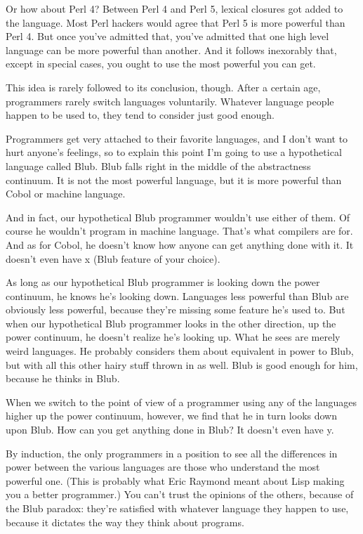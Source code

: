 \documentclass[10pt,twoside,openright]{memoir}
\begin{document}
Or how about Perl 4? Between Perl 4 and Perl 5, lexical closures got added to the language. Most Perl hackers would agree that Perl 5 is more powerful than Perl 4. But once you've admitted that, you've admitted that one high level language can be more powerful than another. And it follows inexorably that, except in special cases, you ought to use the most powerful you can get.

This idea is rarely followed to its conclusion, though. After a certain age, programmers rarely switch languages voluntarily. Whatever language people happen to be used to, they tend to consider just good enough.

Programmers get very attached to their favorite languages, and I don't want to hurt anyone's feelings, so to explain this point I'm going to use a hypothetical language called Blub. Blub falls right in the middle of the abstractness continuum. It is not the most powerful language, but it is more powerful than Cobol or machine language.

And in fact, our hypothetical Blub programmer wouldn't use either of them. Of course he wouldn't program in machine language. That's what compilers are for. And as for Cobol, he doesn't know how anyone can get anything done with it. It doesn't even have x (Blub feature of your choice).

As long as our hypothetical Blub programmer is looking down the power continuum, he knows he's looking down. Languages less powerful than Blub are obviously less powerful, because they're missing some feature he's used to. But when our hypothetical Blub programmer looks in the other direction, up the power continuum, he doesn't realize he's looking up. What he sees are merely weird languages. He probably considers them about equivalent in power to Blub, but with all this other hairy stuff thrown in as well. Blub is good enough for him, because he thinks in Blub.

When we switch to the point of view of a programmer using any of the languages higher up the power continuum, however, we find that he in turn looks down upon Blub. How can you get anything done in Blub? It doesn't even have y.

By induction, the only programmers in a position to see all the differences in power between the various languages are those who understand the most powerful one. (This is probably what Eric Raymond meant about Lisp making you a better programmer.) You can't trust the opinions of the others, because of the Blub paradox: they're satisfied with whatever language they happen to use, because it dictates the way they think about programs.
\end{document}
